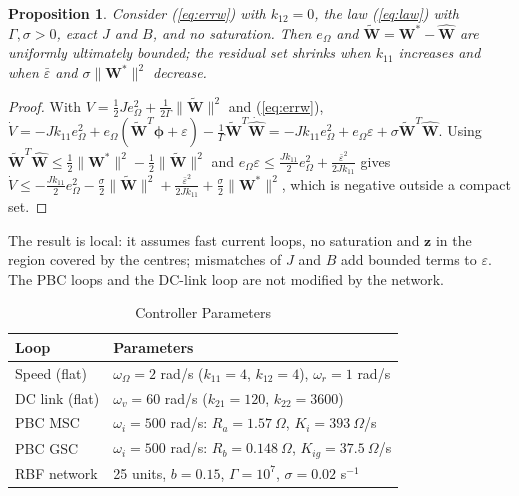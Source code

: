 \documentclass[11pt,a4paper]{article}
\newtheorem{proposition}{Proposition}
\newcommand{\bv}[1]{\mathbf{#1}}
\begin{document}
\begin{proposition}
Consider (\ref{eq:errw}) with $k_{12}=0$, the law (\ref{eq:law}) with $\Gamma,\sigma>0$, exact $J$ and
$B$, and no saturation. Then $e_\Omega$ and $\tilde{\bv{W}}=\bv{W}^*-\hat{\bv{W}}$ are uniformly
ultimately bounded; the residual set shrinks when $k_{11}$ increases and when $\bar\varepsilon$ and
$\sigma\|\bv{W}^*\|^2$ decrease.
\end{proposition}
\begin{proof}
With $V=\frac12Je_\Omega^2+\frac{1}{2\Gamma}\|\tilde{\bv{W}}\|^2$ and (\ref{eq:errw}),
$\dot V=-Jk_{11}e_\Omega^2+e_\Omega(\tilde{\bv{W}}^T\boldsymbol\phi+\varepsilon)
-\frac1\Gamma\tilde{\bv{W}}^T\dot{\hat{\bv{W}}}=-Jk_{11}e_\Omega^2+e_\Omega\varepsilon
+\sigma\tilde{\bv{W}}^T\hat{\bv{W}}$. Using
$\tilde{\bv{W}}^T\hat{\bv{W}}\le\frac12\|\bv{W}^*\|^2-\frac12\|\tilde{\bv{W}}\|^2$ and
$e_\Omega\varepsilon\le\frac{Jk_{11}}{2}e_\Omega^2+\frac{\bar\varepsilon^2}{2Jk_{11}}$ gives
$\dot V\le-\frac{Jk_{11}}{2}e_\Omega^2-\frac\sigma2\|\tilde{\bv{W}}\|^2
+\frac{\bar\varepsilon^2}{2Jk_{11}}+\frac\sigma2\|\bv{W}^*\|^2$, which is negative outside a compact set.
\end{proof}
The result is local: it assumes fast current loops, no saturation and $\bv{z}$ in the region covered by
the centres; mismatches of $J$ and $B$ add bounded terms to $\varepsilon$. The PBC loops and the DC-link
loop are not modified by the network.

\begin{table}[h]
\caption{Controller Parameters}
\label{tab:ctrl}
\centering
\footnotesize
\begin{tabular}{ll}
\toprule
Loop & Parameters\\
\midrule
Speed (flat) & $\omega_\Omega=2$ rad/s ($k_{11}=4$, $k_{12}=4$), $\omega_r=1$ rad/s\\
DC link (flat) & $\omega_v=60$ rad/s ($k_{21}=120$, $k_{22}=3600$)\\
PBC MSC & $\omega_i=500$ rad/s: $R_a=1.57~\Omega$, $K_i=393~\Omega$/s\\
PBC GSC & $\omega_i=500$ rad/s: $R_b=0.148~\Omega$, $K_{ig}=37.5~\Omega$/s\\
RBF network & 25 units, $b=0.15$, $\Gamma=10^7$, $\sigma=0.02$ s$^{-1}$\\
\bottomrule
\end{tabular}
\end{table}
\end{document}
